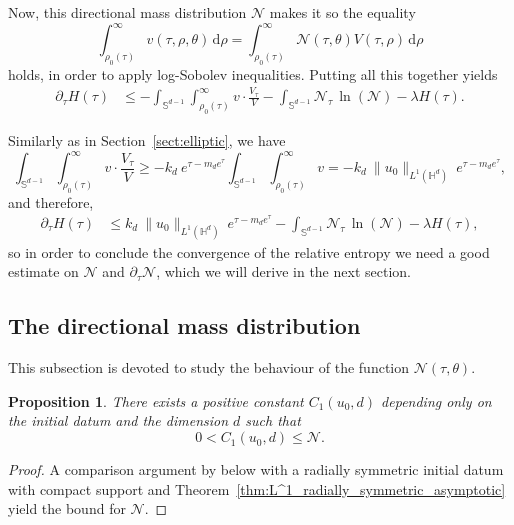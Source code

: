 \documentclass[12pt,longbibliography]{article}
\def\d{\,\mathrm{d}}
\def\d{\,\mathrm{d}}
\def\H{\mathbb{H}}
\newtheorem{prp}[thm]{Proposition}
\theoremstyle{definition}
\theoremstyle{remark}
\theoremstyle{example}
\begin{document}
Now, this directional mass distribution $\mathcal{N}$ makes it so the equality
\[
\int_{\rho_0(\tau)}^\infty v(\tau, \rho, \theta) \d \rho = \int_{\rho_0(\tau)}^\infty \mathcal{N}(\tau, \theta) V(\tau,\rho) \d \rho
\]
holds, in order to apply log-Sobolev inequalities. Putting all this together yields
\[
\begin{aligned}
	\partial_\tau H(\tau) & \leq   - \int_{\mathbb{S}^{d-1}}\int_{\rho_0(\tau)}^\infty v\cdot\frac{V_\tau}{V} -\int_{\mathbb{S}^{d-1}}\mathcal{N}_\tau\, \ln(\mathcal{N})   - \lambda H(\tau).
\end{aligned}
\]

Similarly as in Section~\ref{sect:elliptic}, we have
\[
\int_{\mathbb{S}^{d-1}}\int_{\rho_0(\tau)}^\infty v\cdot\frac{V_\tau}{V}\geq - k_d\ e^{\tau-m_d e^\tau} \int_{\mathbb{S}^{d-1}}\int_{\rho_0(\tau)}^\infty v = - k_d\ \|u_0\|_{L^1(\H^d)}\ e^{\tau-m_d e^\tau},
\]
and therefore,
\begin{equation}\label{eq:entropy_with_N}
	\begin{aligned}
		\partial_\tau H(\tau) & \leq  k_d\ \|u_0\|_{L^1(\H^d)}\ e^{\tau-m_d e^\tau} -\int_{\mathbb{S}^{d-1}}\mathcal{N}_\tau\, \ln(\mathcal{N})   - \lambda H(\tau),
	\end{aligned}
\end{equation}
so in order to conclude the convergence of the relative entropy we need a good estimate on $\mathcal{N}$ and $\partial_\tau \mathcal{N}$, which we will derive in the next section.

\subsection{The directional mass distribution}\label{sect:directional_mass_distribution}

This subsection is devoted to study the behaviour of the function $\mathcal{N}(\tau,\theta)$.

\begin{prp}\label{lem:bounds_N}
	There exists a positive constant $C_1(u_0, d)$ depending only on the initial datum and the dimension $d$ such that
	\[
	0<C_1(u_0, d)\leq \mathcal{N}.
	\]
\end{prp}
\begin{proof}
	A comparison argument by below with a radially symmetric initial datum with compact support and Theorem~\ref{thm:L^1_radially_symmetric_asymptotic} yield the bound for $\mathcal{N}$.
\end{proof}
\end{document}
